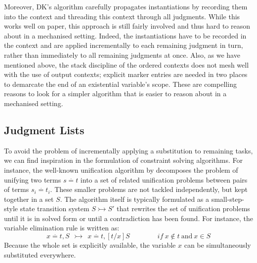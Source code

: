 Moreover, DK's algorithm carefully propagates instantiations by recording them
into the context and threading this context through all judgments. 
While this works well on paper, this approach is still fairly involved and thus
hard to reason about in a mechanised setting. Indeed, the instantiations have
to be recorded in the context and are applied incrementally to each remaining
judgment in turn, rather than immediately to all remaining judgments at once.
Also, as we have mentioned above, the stack discipline of the ordered contexts
does not mesh well with the use of output contexts; explicit marker entries are
needed in two places to demarcate the end of an existential variable's scope.
These are compelling reasons to look for a simpler algorithm that is easier to
reason about in a mechanised setting.


\subsection{Judgment Lists}\label{sec:overview:list}

To avoid the problem of incrementally applying a substitution to remaining
tasks, we can find inspiration in the formulation of constraint solving
algorithms. For instance, the well-known unification
algorithm by \citet{unification} decomposes the problem of unifying two terms $s \stackrel{.}{=} t$ into a set
of related unification problems between pairs of terms $s_i \stackrel{.}{=} t_i$. These smaller
problems are not tackled independently, but kept together in a set $S$. 
The algorithm itself is typically formulated as a small-step-style state
transition system $S \rightarrowtail S'$ that rewrites the set of unification
problems until it is in solved form or until a contradiction has been found.
For instance, the variable elimination rule is written as:
\[
   x \stackrel{.}{=} t, S  ~~\rightarrowtail~~  x \stackrel{.}{=} t, [t/x]S   \qquad\qquad{if}~x \not\in t~\text{and}~{x \in S}
\]
Because the whole set is explicitly available, the variable $x$ can be
simultaneously substituted everywhere.

